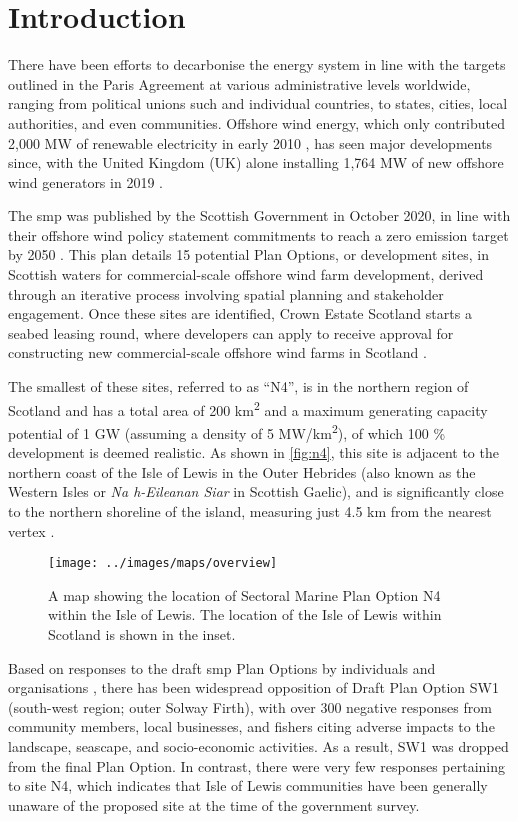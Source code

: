 \chapter{Introduction}

There have been efforts to decarbonise the energy system in line with the targets outlined in the Paris Agreement at various administrative levels worldwide, ranging from political unions such and individual countries, to states, cities, local authorities, and even communities. Offshore wind energy, which only contributed 2,000 MW of renewable electricity in early 2010 \autocite{esteban2011}, has seen major developments since, with the United Kingdom (UK) alone installing 1,764 MW of new offshore wind generators in 2019 \autocite{windeurope2020}.

The \gls{smp} was published by the Scottish Government in October 2020, in line with their offshore wind policy statement commitments to reach a zero emission target by 2050 \autocite{govscot-smp}. This plan details 15 potential Plan Options, or development sites, in Scottish waters for commercial-scale offshore wind farm development, derived through an iterative process involving spatial planning and stakeholder engagement. Once these sites are identified, Crown Estate Scotland starts a seabed leasing round, where developers can apply to receive approval for constructing new commercial-scale offshore wind farms in Scotland \autocite{crownestate}.

The smallest of these sites, referred to as ``N4'', is in the northern region of Scotland and has a total area of 200 km\textsuperscript{2} and a maximum generating capacity potential of 1 GW (assuming a density of 5 MW/km\textsuperscript{2}), of which 100 \% development is deemed realistic. As shown in \autoref{fig:n4}, this site is adjacent to the northern coast of the Isle of Lewis in the Outer Hebrides (also known as the Western Isles or \textit{Na h-Eileanan Siar} in Scottish Gaelic), and is significantly close to the northern shoreline of the island, measuring just 4.5 km from the nearest vertex \autocite{naturescot-smp}.

\begin{figure}
  \centering
  \texttt{[image: ../images/maps/overview]}
  \caption{A map showing the location of Sectoral Marine Plan Option N4 within the Isle of Lewis. The location of the Isle of Lewis within Scotland is shown in the inset. \label{fig:n4}}
\end{figure}

Based on responses to the draft \gls{smp} Plan Options by individuals and organisations \autocite{govscot-smpresponses}, there has been widespread opposition of Draft Plan Option SW1 (south-west region; outer Solway Firth), with over 300 negative responses \autocite{govscot-smp} from community members, local businesses, and fishers citing adverse impacts to the landscape, seascape, and socio-economic activities. As a result, SW1 was dropped from the final Plan Option. In contrast, there were very few responses pertaining to site N4, which indicates that Isle of Lewis communities have been generally unaware of the proposed site at the time of the government survey.

